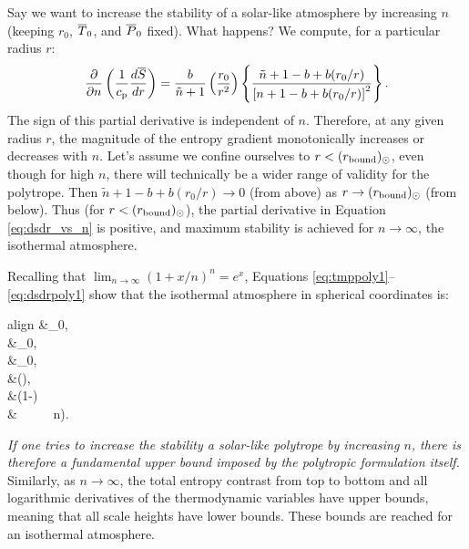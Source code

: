 \documentclass[12pt]{article}
\numberwithin{equation}{section}
\newcommand{\rbound}{r_{\rm{bound}}}
\begin{document}
Say we want to increase the stability of a solar-like atmosphere by increasing $n$ (keeping $r_0$, $\overline{T}_0$, and $\overline{P}_0$ fixed). What happens? We compute, for a particular radius $r$:
\begin{align}\label{eq:dsdr_vs_n}
	\frac{\partial}{\partial n}\left(\frac{1}{c_{\rm{p}}}\frac{d\overline{S}}{dr}\right)=  \frac{b}{\tilde{n}+1}\left(\frac{r_0}{r^2}\right)  \left\{\frac{\tilde{n}+1-b+b(r_0/r)}{\left[n+1-b+b(r_0/r)\right]^2}\right\}. 
\end{align}
The sign of this partial derivative is independent of $n$. Therefore, at any given radius $r$, the magnitude of the entropy gradient monotonically increases or decreases with $n$. Let's assume we confine ourselves to $r<(\rbound)_\odot$, even though for high $n$, there will technically be a wider range of validity for the polytrope. Then $\tilde{n}+1-b+b(r_0/r)\rightarrow0$ (from above) as $r\rightarrow(\rbound)_\odot$ (from below). Thus (for $r<(\rbound)_\odot$), the partial derivative in Equation \eqref{eq:dsdr_vs_n} is positive, and maximum stability is achieved for $n\rightarrow\infty$, the isothermal atmosphere. 

Recalling that $\lim_{n\rightarrow\infty}(1+x/n)^n=e^x$, Equations \eqref{eq:tmppoly1}--\eqref{eq:dsdrpoly1} show that the isothermal atmosphere in spherical coordinates is:
	\begin{empheq}[box=\fbox]{align}\label{eq:limitninfty}
\tmpref\ofr&\rightarrow \tmpref_0, \\
\prsref\ofr&\rightarrow \prsref_0,\\
\rhoref\ofr&\rightarrow \rhoref_0,\\
\dsdr &\rightarrow {}\left(\right),\\
 \andd \frac{\sref\ofr}{\cp} &\rightarrow {}\left(1-\right)\\ 
 &\ \ \ \ \  n\rightarrow\infty). \nonumber
\end{empheq}
\textit{If one tries to increase the stability a solar-like polytrope by increasing $n$, there is therefore a fundamental upper bound imposed by the polytropic formulation itself.}
Similarly, as $n\rightarrow\infty$, the total entropy contrast from top to bottom and all logarithmic derivatives of the thermodynamic variables have upper bounds, meaning that all scale heights have lower bounds. These bounds are reached for an isothermal atmosphere.
\end{document}
